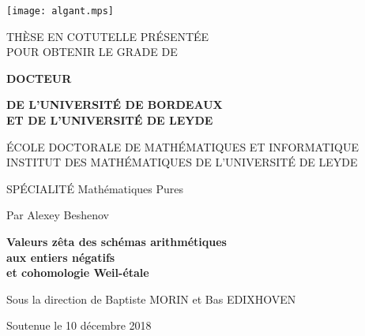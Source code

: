 \thispagestyle{empty}

\ifdefined\dutch
\else
\begin{center}
  \noindent{}\hspace{0.9cm}
  \hspace{0.9cm}
  \texttt{[image: algant.mps]}
\end{center}
\fi

\begingroup
\normalfont\sffamily
\begin{center}
  \noindent THÈSE EN COTUTELLE PRÉSENTÉE \\
  POUR OBTENIR LE GRADE DE

  \vspace{0.5em}

  \noindent \textbf{DOCTEUR}

  \vspace{0.5em}

  \noindent \textbf{DE L’UNIVERSITÉ DE BORDEAUX} \\
  \textbf{ET DE L’UNIVERSITÉ DE LEYDE}

  \vspace{0.5em}

  \noindent ÉCOLE DOCTORALE DE MATHÉMATIQUES ET INFORMATIQUE \\
  INSTITUT DES MATHÉMATIQUES DE L’UNIVERSITÉ DE LEYDE

  \vspace{0.5em}

  \noindent SPÉCIALITÉ Mathématiques Pures

  \vspace{0.5em}

  \noindent Par Alexey Beshenov

  \vspace{0.75em}

  {\large\noindent\textbf{Valeurs zêta des schémas arithmétiques\\
      aux entiers négatifs\\
      et cohomologie Weil-étale}

  }

  \vspace{0.75em}

  \noindent Sous la direction de Baptiste MORIN et Bas EDIXHOVEN

  \vspace{0.75em}

  \noindent Soutenue le 10 décembre 2018
\end{center}

